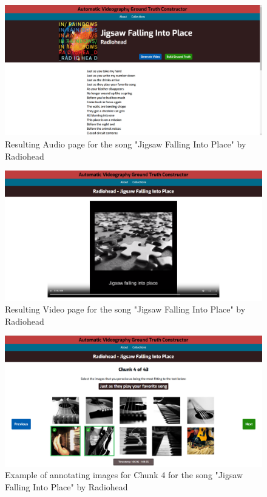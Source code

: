 \documentclass{l4proj}
\begin{document}
\begin{appendices}
\begin{figure}
    \centering
    \includegraphics[width=1\textwidth]{figures/walkthrough_audio_page.pdf}
    \caption{Resulting Audio page for the song "Jigsaw Falling Into Place" by Radiohead}
    \label{fig:walkthrough_audio_page}
\end{figure}

\begin{figure}
    \centering
    \includegraphics[width=1\textwidth]{figures/walkthrough_video_page.pdf}
    \caption{Resulting Video page for the song "Jigsaw Falling Into Place" by Radiohead}
    \label{fig:walkthrough_video_page}
\end{figure}

\begin{figure}
    \centering
    \includegraphics[width=1\textwidth]{figures/walkthrough_chunk_page.pdf}
    \caption{Example of annotating images for Chunk 4 for the song "Jigsaw Falling Into Place" by Radiohead}
    \label{fig:walkthrough_chunk_page}
\end{figure}


\end{appendices}
\end{document}

